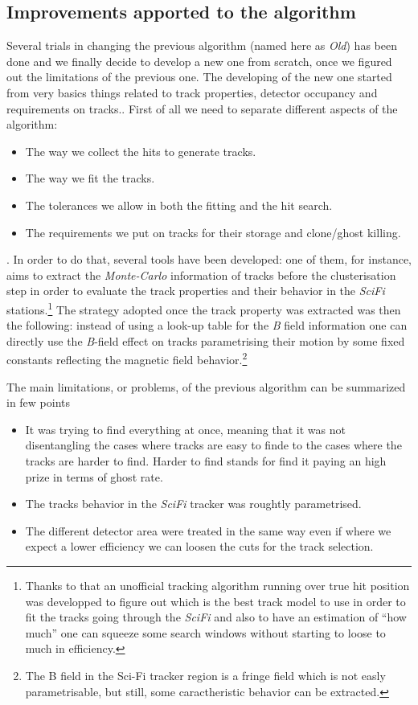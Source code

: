 \documentclass[paper=a4, fontsize=10pt]{scrartcl}
\numberwithin{equation}{section}		%
\numberwithin{figure}{section}			%
\numberwithin{table}{section}				%
\begin{document}
\subsection{Improvements apported to the algorithm}
Several trials in changing the previous algorithm (named here as \textit{Old}) has been done and we finally decide to develop a new one from scratch, once we figured out the limitations of the previous one. The developing of the new one started from very basics things related to track properties, detector occupancy and requirements on tracks.. First of all we need to separate different aspects of the algorithm: 
\begin{itemize}
\item{The way we collect the hits to generate tracks.}
\item{The way we fit the tracks.}
\item{The tolerances we allow in both the fitting and the hit search.}
\item{The requirements we put on tracks for their storage and clone/ghost killing.}
\end{itemize}.
In order to do that, several tools have been developed: one of them, for instance, aims to extract the \textit{Monte-Carlo} information of tracks before the clusterisation step in order to evaluate the track properties and their behavior in the \textit{SciFi} stations.\footnote{Thanks to that an unofficial tracking algorithm running over true hit position was developped to figure out which is the best track model to use in order to fit the tracks going through the \textit{SciFi} and also to have an estimation of ``how much'' one can squeeze some search windows without starting to loose to much in efficiency.} The strategy adopted once the track property was extracted was then the following: instead of using a look-up table for the \textit{B} field information one can directly use the \textit{B}-field effect on tracks parametrising their motion by some fixed constants reflecting the magnetic field behavior.\footnote{The B field in the Sci-Fi tracker region is a fringe field which is not easly parametrisable, but still, some caractheristic behavior can be extracted.}

The main limitations, or problems, of the previous algorithm can be summarized in few points \begin{itemize} \item{It was trying to find everything at once, meaning that it was not disentangling the cases where tracks are easy to finde to the cases where the tracks are harder to find. Harder to find stands for find it paying an high prize in terms of ghost rate.} \item{The tracks behavior in the \textit{SciFi} tracker was roughtly parametrised.} \item{The different detector area were treated in the same way even if where we expect a lower efficiency we can loosen the cuts for the track selection.}
\end{itemize}
\end{document}
